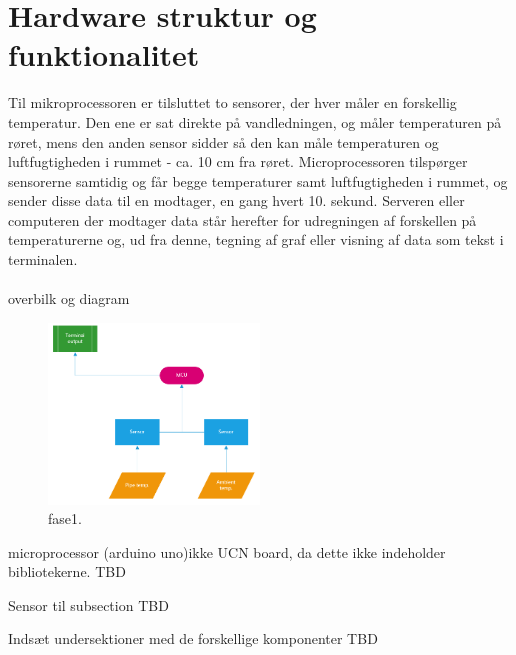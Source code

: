 \section{Hardware struktur og funktionalitet}
Til mikroprocessoren er tilsluttet to sensorer, der hver måler en forskellig temperatur. Den ene er sat direkte på vandledningen, og måler temperaturen på røret, mens den anden sensor sidder så den kan måle temperaturen og luftfugtigheden i rummet - ca. 10 cm fra røret.\newline
Microprocessoren tilspørger sensorerne samtidig og får begge temperaturer samt luftfugtigheden i rummet, og sender disse data til en modtager, en gang hvert 10. sekund.\newline
Serveren eller computeren der modtager data står herefter for udregningen af forskellen på temperaturerne og, ud fra denne, tegning af graf eller visning af data som tekst i terminalen.
\\\\
overbilk og diagram

\begin{figure}[h!]
  \caption{fase1.}
  \centering
  \includegraphics[width=0.5\textwidth]{figures/Phase1.PNG}
\end{figure}


microprocessor (arduino uno)ikke UCN board, da dette ikke indeholder bibliotekerne. TBD

Sensor til subsection TBD



Indsæt undersektioner med de forskellige komponenter TBD
